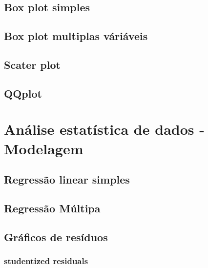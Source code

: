 \documentclass[
]{book}
\begin{document}
\hypertarget{box-plot-simples}{%
\subsection{Box plot simples}\label{box-plot-simples}}

\hypertarget{box-plot-multiplas-vuxe1riuxe1veis}{%
\subsection{Box plot multiplas váriáveis}\label{box-plot-multiplas-vuxe1riuxe1veis}}

\hypertarget{scater-plot}{%
\subsection{Scater plot}\label{scater-plot}}

\hypertarget{qqplot}{%
\subsection{QQplot}\label{qqplot}}

\hypertarget{anuxe1lise-estatuxedstica-de-dados---modelagem}{%
\section{Análise estatística de dados - Modelagem}\label{anuxe1lise-estatuxedstica-de-dados---modelagem}}

\hypertarget{regressuxe3o-linear-simples}{%
\subsection{Regressão linear simples}\label{regressuxe3o-linear-simples}}

\hypertarget{regressuxe3o-muxfaltipa}{%
\subsection{Regressão Múltipa}\label{regressuxe3o-muxfaltipa}}

\hypertarget{gruxe1ficos-de-resuxedduos}{%
\subsection{Gráficos de resíduos}\label{gruxe1ficos-de-resuxedduos}}

\hypertarget{studentized-residuals}{%
\subsubsection{studentized residuals}\label{studentized-residuals}}
\end{document}
